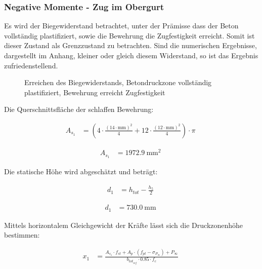 \documentclass[
  11pt,
  letterpaper,
]{scrreprt}
\begin{document}
\subsubsection{Negative Momente - Zug im
Obergurt}\label{negative-momente---zug-im-obergurt}

Es wird der Biegewiderstand betrachtet, unter der Prämisse dass der
Beton vollständig plastifiziert, sowie die Bewehrung die Zugfestigkeit
erreicht. Somit ist dieser Zustand als Grenzzustand zu betrachten. Sind
die numerischen Ergebnisse, dargestellt im Anhang, kleiner oder gleich
diesem Widerstand, so ist das Ergebnis zufriedenstellend.

\begin{figure}[H]


\caption{\label{fig-t6_qs_MR}Erreichen des Biegewiderstands,
Betondruckzone vollständig plastifiziert, Bewehrung erreicht
Zugfestigkeit}

\end{figure}%

Die Querschnittsfläche der schlaffen Bewehrung:

$$
\begin{aligned}
A_{s_{1}} &= \left( 4 \cdot \frac{ \left( 14 \cdot \mathrm{mm} \right) ^{ 2 } }{ 4 } + 12 \cdot \frac{ \left( 12 \cdot \mathrm{mm} \right) ^{ 2 } }{ 4 } \right) \cdot \pi \; 
\end{aligned}
$$

$$
\begin{aligned}
A_{s_{1}} &= 1972.9\ \mathrm{mm}^{2} \;
\end{aligned}
$$

Die statische Höhe wird abgeschätzt und beträgt:

$$
\begin{aligned}
d_{1} &= h_{tot} - \frac{ h_{5} }{ 2 } \; 
\end{aligned}
$$

$$
\begin{aligned}
d_{1} &= 730.0\ \mathrm{mm} \;
\end{aligned}
$$

Mittels horizontalem Gleichgewicht der Kräfte lässt sich die
Druckzonenhöhe bestimmen:

$$
\begin{aligned}
x_{1} &= \frac{ A_{s_{1}} \cdot f_{st} + A_{p} \cdot \left( f_{pt} - \sigma_{P_{\infty}} \right) + P_{\infty} }{ b_{tot_{inf}} \cdot 0.85 \cdot f_{c} } \; 
\end{aligned}
$$
\end{document}
